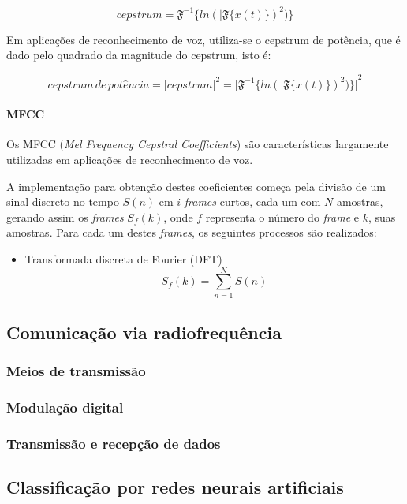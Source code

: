 \documentclass[a4paper, 12pt]{article}
\begin{document}
		$$ cepstrum = \mathfrak{F}^{-1}\Big\{ln(|\mathfrak{F}\{x(t)\})^{2})\Big\} $$
		
		Em aplicações de reconhecimento de voz, utiliza-se o cepstrum de potência, que é dado pelo quadrado da magnitude do cepstrum, isto é:
		
		$$ cepstrum \, de \, pot\hat{e}ncia = |cepstrum|^{2} = {\Big|\mathfrak{F}^{-1}\Big\{ln(|\mathfrak{F}\{x(t)\})^{2})\Big\}\Big|}^{2} $$
		
			\paragraph{MFCC}
			
			Os MFCC (\textit{Mel Frequency Cepstral Coefficients}) são características largamente utilizadas em aplicações de reconhecimento de voz.\cite{benesty2007springer}
			
			A implementação para obtenção destes coeficientes começa pela divisão de um sinal discreto no tempo $S(n)$ em $i$ \textit{frames} curtos, cada um com $N$ amostras, gerando assim os \textit{frames} \textbf{$S_f(k)$}, onde $f$ representa o número do \textit{frame} e $k$, suas amostras. Para cada um destes \textit{frames}, os seguintes processos são realizados:
			\begin{itemize}
				\item Transformada discreta de Fourier (DFT)
				$$ S_f(k) = \sum_{n=1}^{N}S(n) $$
			\end{itemize}
			
		
		\subsection{Comunicação via radiofrequência}
		\subsubsection{Meios de transmissão}
		\subsubsection{Modulação digital}
		\subsubsection{Transmissão e recepção de dados}
		
		\subsection{Classificação por redes neurais artificiais}
		
\end{document}
